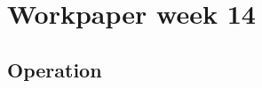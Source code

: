 

\author{Group D608F17}
\title{}



\maketitle

\section{Workpaper week 14}\citep{Meredith2005}

\subsection{Operation}




\grid
\grid
